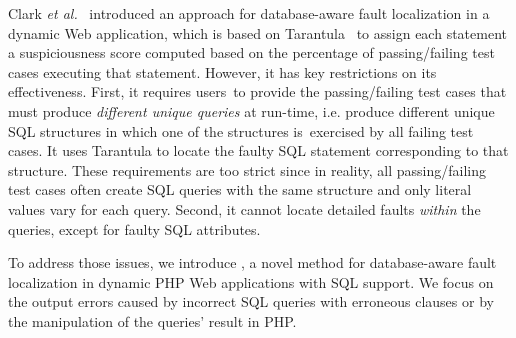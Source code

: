 Clark {\em et al.}~\cite{ga-ase11} introduced an approach for
database-aware fault localization in a dynamic Web application, which
is based on Tarantula~\cite{tarantula05} to assign each statement a
suspiciousness score computed based on the percentage of
passing/failing test cases executing that statement. However, it has
key restrictions on its effectiveness. First, it requires users~to provide
the passing/failing test cases that must produce {\em different unique
queries} at run-time, i.e. produce different unique SQL structures in
which one of the structures is~exercised by all failing test
cases. It uses Tarantula to locate the faulty SQL statement
corresponding to that structure.
These requirements are too strict since in reality, all
passing/failing test cases often create SQL queries with the same
structure and only literal values vary for each query.
Second, it cannot locate detailed faults {\em within} the queries,
except for faulty SQL attributes.


To address those issues, we introduce {\tool}, a novel method for
database-aware fault localization in dynamic PHP Web
applications with SQL support. We focus on the output errors caused
by incorrect SQL queries with erroneous  clauses or by the
manipulation of the queries' result in PHP. 

